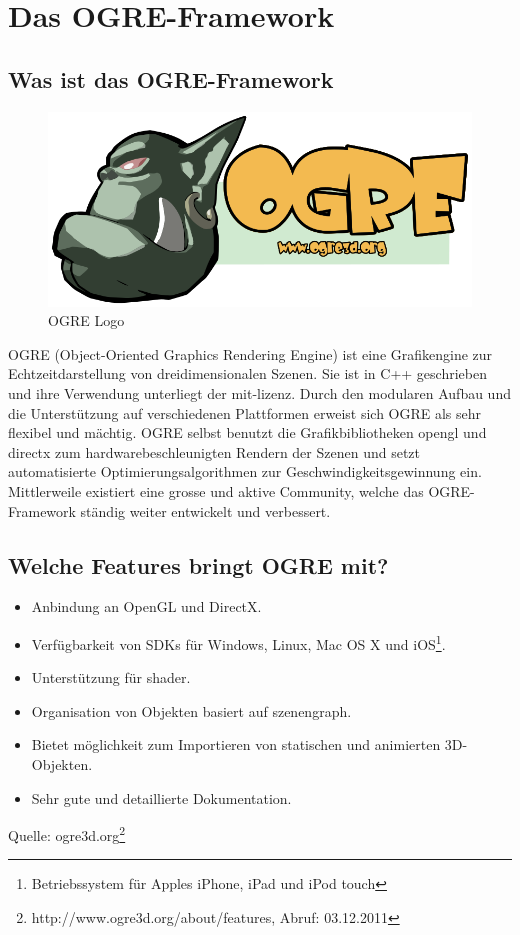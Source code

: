 \section{Das OGRE-Framework}
\label{ogre-framework}

\subsection{Was ist das OGRE-Framework}

\begin{figure}
	\includegraphics[width=1\linewidth]{src/OgreLogo.png}
	\caption{OGRE Logo} %
	\label{OGRE Logo} %
\end{figure}

OGRE (Object-Oriented Graphics Rendering Engine) ist eine Grafikengine zur Echtzeitdarstellung von dreidimensionalen Szenen. Sie ist in C++ geschrieben und ihre Verwendung unterliegt der \gls{mit-lizenz}. Durch den modularen Aufbau und die Unterstützung auf verschiedenen Plattformen erweist sich OGRE als sehr flexibel und mächtig. OGRE selbst benutzt die Grafikbibliotheken \gls{opengl} und \gls{directx} zum hardwarebeschleunigten Rendern der Szenen und setzt automatisierte Optimierungsalgorithmen zur Geschwindigkeitsgewinnung ein. Mittlerweile existiert eine grosse und aktive Community, welche das OGRE-Framework ständig weiter entwickelt und verbessert.

\subsection{Welche Features bringt OGRE mit?}

\begin{itemize}
	\item Anbindung an OpenGL und DirectX.
	\item Verfügbarkeit von SDKs für Windows, Linux, Mac OS X und iOS\footnote{Betriebssystem für Apples iPhone, iPad und iPod touch}.
	\item Unterstützung für \gls{shader}.
	\item Organisation von Objekten basiert auf \gls{szenengraph}.
	\item Bietet möglichkeit zum Importieren von statischen und animierten 3D-Objekten.
	\item Sehr gute und detaillierte Dokumentation.
\end{itemize}
Quelle: ogre3d.org\footnote{http://www.ogre3d.org/about/features, Abruf: 03.12.2011}

